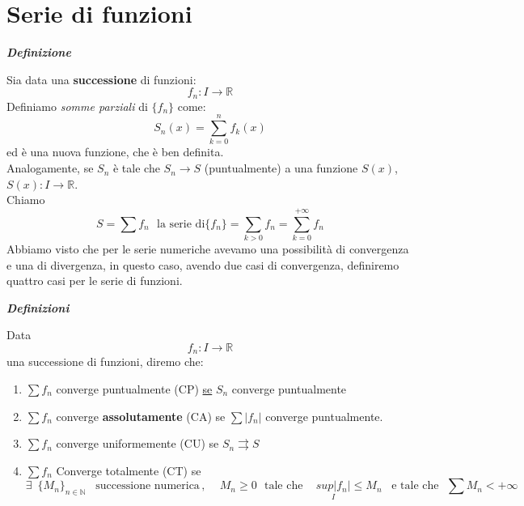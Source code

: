 \documentclass{article}
\theoremstyle{definition}
\newcommand{\R}{\mathbb{R}}
\newcommand{\N}{\mathbb{N}}
\begin{document}
\section{Serie di funzioni}
\begin{center}
    \textbf{\textit{Definizione}}
\end{center}
Sia data una \textbf{successione } di funzioni:\begin{equation}
    f_n : I \to \R
\end{equation}
Definiamo \textit{somme parziali} di $\{f_n\}$ come:
\begin{equation}
    S_n(x)=\sum_{k=0}^n f_k(x)
\end{equation}
ed è una nuova funzione, che è ben definita.
\\
Analogamente, se $S_n$ è tale che $S_n \to S$ (puntualmente) a una funzione $S(x)$, $S(x): I \to \R$.
\\
Chiamo 
\begin{equation}
    S=\sum f_n \,\,\,\, \mbox{la serie di} \{f_n\} = \sum_{k > 0} f_n = \sum_{k=0}^{+\infty} f_n
\end{equation}
Abbiamo visto che per le serie numeriche avevamo una possibilità di convergenza e una di divergenza, in questo caso, avendo due casi di convergenza, definiremo quattro casi per le serie di funzioni.
\\
\begin{center}
    \textbf{\textit{Definizioni}}
\end{center}
Data
\begin{equation*}
    f_n: I \to \R
\end{equation*}
una successione di funzioni, diremo che:
\begin{enumerate}
\item $\sum f_n$
converge puntualmente (CP) \underline{se} $S_n$ converge puntualmente
    \item $\sum f_n$ converge \textbf{assolutamente} (CA) se
    $\sum \left| f_n\right|$
    converge puntualmente.
    \item $\sum f_n$
    converge uniformemente (CU) se $S_n \rightrightarrows S$
    \item $\sum f_n$
    Converge totalmente (CT) se
    \begin{equation}
        \exists \,\,\, \{M_n\}_{n \in \N} \,\,\,\,\, \mbox{successione numerica}\,,\,\,\,\,\,\,\, M_n \geqslant 0 \,\,\,\, \mbox{tale che }\,\,\,\,\, \underset{I}{sup|f_n|} \leqslant M_n \,\,\,\,\, \mbox{e tale che} \,\,\,\, \sum M_n < +\infty
    \end{equation}
\end{enumerate}
\end{document}
